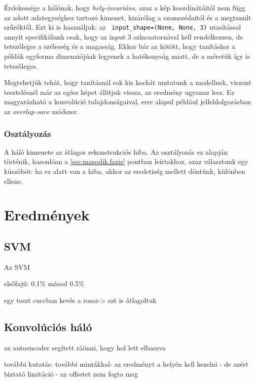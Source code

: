 Érdekessége a hálónak, hogy \textit{hely-invariáns}, azaz a kép koordinátáitól nem függ az adott
adategységhez tartozó kimenet, kizárólag a szomszédaitól és a megtanult szűrőktől.
Ezt ki is használjuk: az \texttt{ input\_shape=(None, None, 3)} utasítással annyit
specifikálunk csak, hogy az input 3 színcsatornával kell rendelkezzen, de tetszőleges
a szélesség és a magasság. Ekkor bár az kötött, hogy tanításkor a példák egyforma 
dimenziójúak legyenek a hatékonyság miatt, de a méretük így is tetszőleges.


Megtehetjük tehát, hogy tanításnál sok kis kockát mutatunk a modellnek, viszont tesztelésnél
már az egész képet állítjuk vissza, az eredmény ugyanaz lesz. Ez magyarázható a konvolúció 
tulajdonságaival, erre alapul például jelfeldolgozásban az \textit{overlap-save} módszer.



\subsubsection{Osztályozás}

A háló kimenete az átlagos rekonstrukciós hiba. Az osztályozás ez alapján történik,
hasonlóan a \ref{sec:masodik.fazis} pontban leírtakhoz, azaz választunk egy küszöböt:
ha ez alatt van a hiba, akkor az eredetiség mellett döntünk, különben ellene.



\newpage
\section{Eredmények}

\subsection{SVM}

Az SVM 

elsőfajú: 0.1\%
másod 0.5\%

egy teszt cuccban kevés a rossz-> ezt is átlagoltuk

\subsection{Konvolúciós háló}




az autoencoder segített ráönni, hogy hol lett elbaszva

további kutatás: további mintákkal-
az eredményt a helyén kell kezelni - de azért bíztató
limitáció - az offsetet nem fogta meg


